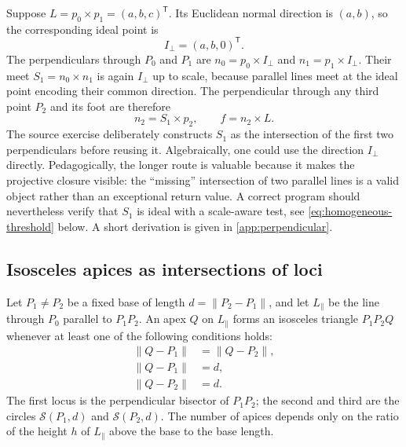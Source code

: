 \documentclass[11pt,a4paper]{article}
\theoremstyle{plain}
\theoremstyle{definition}
\theoremstyle{remark}
\newcommand{\T}{\mathsf{T}}
\newcommand{\norm}[1]{\left\lVert#1\right\rVert}
\newcommand{\Sph}{\mathcal{S}}
\begin{document}
Suppose $L=p_0\times p_1=(a,b,c)^{\T}$. Its Euclidean normal direction is
$(a,b)$, so the corresponding ideal point is
\begin{equation}
  I_{\perp}=(a,b,0)^{\T}.
\end{equation}
The perpendiculars through $P_0$ and $P_1$ are $n_0=p_0\times I_{\perp}$ and
$n_1=p_1\times I_{\perp}$. Their meet $S_1=n_0\times n_1$ is again $I_{\perp}$
up to scale, because parallel lines meet at the ideal point encoding their
common direction. The perpendicular through any third point $P_2$ and its foot
are therefore
\begin{equation}
  n_2=S_1\times p_2,
  \qquad
  f=n_2\times L.
  \label{eq:perpendicular-foot}
\end{equation}
The source exercise deliberately constructs $S_1$ as the intersection of the
first two perpendiculars before reusing it. Algebraically, one could use the
direction $I_\perp$ directly. Pedagogically, the longer route is valuable
because it makes the projective closure visible: the ``missing'' intersection
of two parallel lines is a valid object rather than an exceptional return value.
A correct program should nevertheless verify that $S_1$ is ideal with a
scale-aware test, see \cref{eq:homogeneous-threshold} below. A short derivation
is given in \cref{app:perpendicular}.

\subsection{Isosceles apices as intersections of loci}\label{sec:isosceles}

Let $P_1\neq P_2$ be a fixed base of length $d=\norm{P_2-P_1}$, and let
$L_{\parallel}$ be the line through $P_0$ parallel to $P_1P_2$. An apex $Q$ on
$L_{\parallel}$ forms an isosceles triangle $P_1P_2Q$ whenever at least one of
the following conditions holds:
\begin{align}
  \norm{Q-P_1}&=\norm{Q-P_2}, \label{eq:iso1}\\
  \norm{Q-P_1}&=d, \label{eq:iso2}\\
  \norm{Q-P_2}&=d. \label{eq:iso3}
\end{align}
The first locus is the perpendicular bisector of $P_1P_2$; the second and third
are the circles $\Sph(P_1,d)$ and $\Sph(P_2,d)$. The number of apices depends
only on the ratio of the height $h$ of $L_\parallel$ above the base to the base
length.
\end{document}
